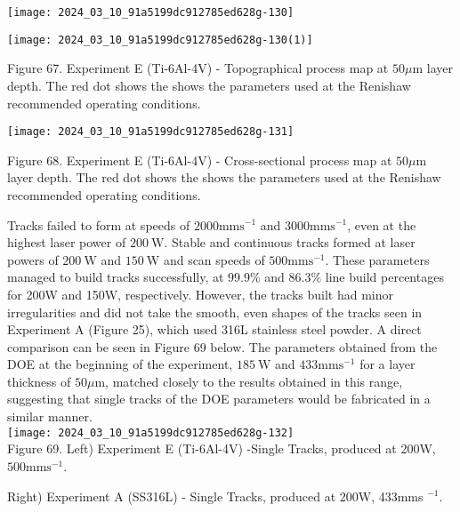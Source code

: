 \documentclass[10pt]{article}
\begin{document}
\begin{center}
\texttt{[image: 2024\_03\_10\_91a5199dc912785ed628g-130]}
\end{center}

\begin{center}
\texttt{[image: 2024\_03\_10\_91a5199dc912785ed628g-130(1)]}
\end{center}

Figure 67. Experiment E (Ti-6Al-4V) - Topographical process map at $50 \mu \mathrm{m}$ layer depth. The red dot shows the shows the parameters used at the Renishaw recommended operating conditions.

\begin{center}
\texttt{[image: 2024\_03\_10\_91a5199dc912785ed628g-131]}
\end{center}

Figure 68. Experiment E (Ti-6Al-4V) - Cross-sectional process map at $50 \mu \mathrm{m}$ layer depth. The red dot shows the shows the parameters used at the Renishaw recommended operating conditions.

Tracks failed to form at speeds of $2000 \mathrm{mms}^{-1}$ and $3000 \mathrm{mms}^{-1}$, even at the highest laser power of $200 \mathrm{~W}$. Stable and continuous tracks formed at laser powers of $200 \mathrm{~W}$ and $150 \mathrm{~W}$ and scan speeds of $500 \mathrm{mms}^{-1}$. These parameters managed to build tracks successfully, at $99.9 \%$ and $86.3 \%$ line build percentages for 200W and 150W, respectively. However, the tracks built had minor irregularities and did not take the smooth, even shapes of the tracks seen in Experiment A (Figure 25), which used 316L stainless steel powder. A direct comparison can be seen in Figure 69 below. The parameters obtained from the DOE at the beginning of the experiment, $185 \mathrm{~W}$ and $433 \mathrm{mms}^{-1}$ for a layer thickness of $50 \mu \mathrm{m}$, matched closely to the results obtained in this range, suggesting that single tracks of the DOE parameters would be fabricated in a similar manner.\\
\texttt{[image: 2024\_03\_10\_91a5199dc912785ed628g-132]}\\
Figure 69. Left) Experiment E (Ti-6Al-4V) -Single Tracks, produced at 200W,\\
$500 \mathrm{mms}^{-1}$.

Right) Experiment A (SS316L) - Single Tracks, produced at 200W, 433mms ${ }^{-1}$.
\end{document}
